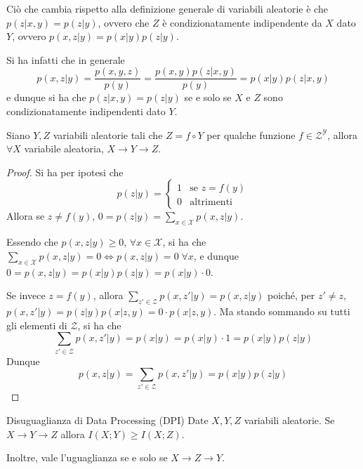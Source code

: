 \begin{observation}{}
  Ciò che cambia rispetto alla definizione generale di variabili aleatorie è che \(p(z|x,y) = p(z|y)\), ovvero che \(Z\) è condizionatamente indipendente da \(X\) dato \(Y\),
  ovvero \(p(x,z|y) = p(x|y)p(z|y)\). 
  
  Si ha infatti che in generale 
  \[p(x,z|y) = \frac{p(x,y,z)}{p(y)} = \frac{p(x,y)p(z|x,y)}{p(y)} = p(x|y)p(z|x,y) \]
  e dunque si ha che \(p(z|x,y) = p(z|y)\) se e solo se \(X\) e \(Z\) sono condizionatamente indipendenti dato \(Y\).
\end{observation}

\begin{proposition}[label=prop:markov_chain_third_funcion_second]{}
  Siano \(Y,Z\) variabili aleatorie tali che \(Z = f \circ Y\) per qualche funzione \(f \in \mathcal{Z}^{\mathcal{Y}}\), allora \( \forall X\) variabile aleatoria, \(X \to Y \to Z\).
\end{proposition}
\begin{proof}
  Si ha per ipotesi che
  \begin{equation*}
    p(z|y) = \begin{cases}
      1 & \text{se } z = f(y) \\
      0 & \text{altrimenti}
    \end{cases}
  \end{equation*}
  Allora se \(z\neq f(y)\), \(0= p(z|y)=\sum_{x\in\mathcal{X}}p(x,z|y)\).
  
  Essendo che \(p(x,z|y)\geq 0\), \(\forall x \in \mathcal{X}\), si ha che \(\sum_{x\in\mathcal{X}}p(x,z|y) = 0 \iff p(x,z|y)=0 \; \forall x\), e dunque \(0=p(x,z|y) = p(x|y)p(z|y) = p(x|y)\cdot 0\).

  Se invece \(z = f(y)\), allora \(\sum_{z' \in \mathcal{Z}}p(x,z'|y)=p(x,z|y)\) poiché, per \(z'\neq z\), \( p(x,z'|y)=p(z|y)p(x|z,y)=0 \cdot p(x|z,y)\). 
  Ma stando sommando su tutti gli elementi di \(\mathcal{Z}\), si ha che 
  \[\sum_{z' \in \mathcal{Z}}p(x,z'|y) = p(x|y)=p(x|y)\cdot 1 = p(x|y)p(z|y)\]
  Dunque
  \[p(x,z|y) = \sum_{z' \in \mathcal{Z}}p(x,z'|y)= p(x|y)p(z|y)\]
\end{proof}

\begin{proposition}[namedlabel={prop:dpi}{Disuguaglianza di Data Processing (DPI)}]{Disuguaglianza di Data Processing (DPI)}
  Date \(X,Y,Z\) variabili aleatorie.
  Se \(X \to Y \to Z\) allora \(I(X;Y) \geq I(X;Z)\).

  Inoltre, vale l'uguaglianza se e solo se \(X \to Z \to Y\).
\end{proposition}

